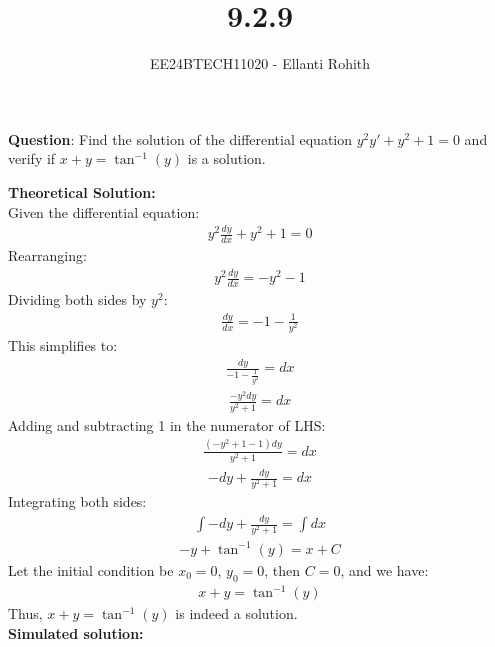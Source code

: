 \documentclass[journal]{IEEEtran}
\numberwithin{equation}{enumi}
\numberwithin{figure}{enumi}
\renewcommand{\thetable}{\theenumi}
\begin{document}

\vspace{3cm}

\title{9.2.9}
\author{EE24BTECH11020 - Ellanti Rohith}
\maketitle

\renewcommand{\thefigure}{\theenumi}
\renewcommand{\thetable}{\theenumi}

\textbf{Question}: Find the solution of the differential equation $
y^{2}y' + y^2 + 1 = 0$ and verify if $ x + y = \tan^{-1}(y) $ is a solution.
\\
\vspace{3.5pt}


\textbf{Theoretical Solution:} \\
Given the differential equation:
\begin{align}
y^{2} \frac{dy}{dx} + y^2 + 1 = 0
\end{align}
Rearranging:
\begin{align}
y^{2} \frac{dy}{dx} = -y^{2} - 1
\end{align}
Dividing both sides by $ y^2 $:
\begin{align}
\frac{dy}{dx} = -1 - \frac{1}{y^2}
\end{align}
This simplifies to:
\begin{align}
\frac{dy}{-1 - \frac{1}{y^2}} = dx
\end{align}
\begin{align}
\frac{-y^2 dy}{y^2 + 1} = dx
\end{align}
Adding and subtracting 1 in the numerator of  LHS:
\begin{align}
\frac{(-y^2 + 1 - 1) dy}{y^2 + 1} = dx
\end{align}
\begin{align}
- dy + \frac{dy}{y^2 + 1} = dx
\end{align}
Integrating both sides:
\begin{align}
\int -dy + \frac{dy}{y^2 + 1} = \int dx
\end{align}
\begin{align}
-y + \tan^{-1}(y) = x + C
\end{align}
Let the initial condition be $ x_0 = 0 $, $ y_0 = 0 $, then $ C = 0 $, and we have:
\begin{align}
x + y = \tan^{-1}(y)
\end{align}
Thus, $ x + y = \tan^{-1}(y) $ is indeed a solution.\\
\textbf{Simulated solution:} \\
\end{document}
